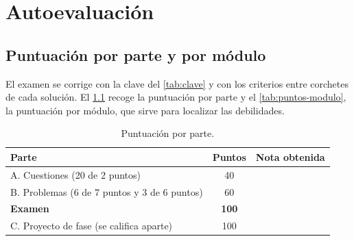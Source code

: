 \chapter{Autoevaluación}
\label{ap:autoevaluacion}

\section{Puntuación por parte y por módulo}

El examen se corrige con la clave del \cref{tab:clave} y con los criterios entre corchetes de cada solución. El \cref{tab:puntos-parte} recoge la puntuación por parte y el \cref{tab:puntos-modulo}, la puntuación por módulo, que sirve para localizar las debilidades.

\begin{table}[h]
\centering\small
\caption{Puntuación por parte.}\label{tab:puntos-parte}
\begin{tabular}{@{}lcc@{}}
\toprule
Parte & Puntos & Nota obtenida \\
\midrule
A. Cuestiones (20 de 2 puntos) & 40 & \\
B. Problemas (6 de 7 puntos y 3 de 6 puntos) & 60 & \\
\midrule
\textbf{Examen} & \textbf{100} & \\
\midrule
C. Proyecto de fase (se califica aparte) & 100 & \\
\bottomrule
\end{tabular}
\end{table}

